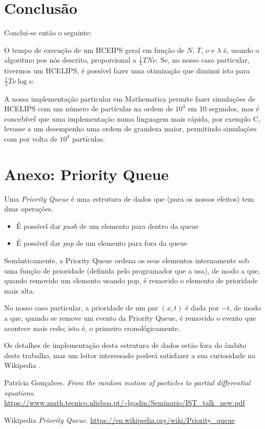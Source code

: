 \documentclass{article}
\begin{document}
	\section{Conclusão}
	
	Conclui-se então o seguinte:
	
	O tempo de execução de um HCEIPS geral em função de $N$, $T$, $\nu$ e $\lambda$ é, usando o algoritmo pos nós descrito, proporcional a $\frac 1 \lambda T N \nu$. Se, no nosso caso particular, tivermos um HCELIPS, é possível fazer uma otimização que diminui isto para $\frac 1 \lambda T \nu \log \nu$.
	
	A nossa implementação particular em Mathematica permite fazer simulações de HCELIPS com um número de partículas na ordem de $10^3$ em 10 segundos, mas é concebível que uma implementação numa linguagem mais rápida, por exemplo C, levasse a um desempenho uma ordem de grandeza maior, permitindo simulações com por volta de $10^4$ partículas.
	
	\section{Anexo: Priority Queue}
	
	Uma \emph{Priority Queue} é uma estrutura de dados que (para os nossos efeitos) tem duas operações.
	
	\begin{itemize}
	\item É possível dar \emph{push} de um elemento para dentro da queue
	
	\item É possível dar \emph{pop} de um elemento para fora da queue
	\end{itemize}
	
	Semânticamente, a Priority Queue ordena os seus elementos internamente sob uma função de prioridade (definida pelo programador que a usa), de modo a que, quando removido um elemento usando pop, é removido o elemento de prioridade mais alta.
	
	No nosso caso particular, a prioridade de um par $(x, t)$ é dada por $-t$, de modo a que, quando se remove um evento da Priority Queue, é removido o evento que acontece mais cedo; isto é, o primeiro cronológicamente.
	
	Os detalhes de implementação desta estrutura de dados estão fora do âmbito deste trabalho, mas um leitor interessado poderá satisfazer a sua curiosidade na Wikipedia \cite{wiki}. 
	
	

\begin{thebibliography}{9}
Patrícia Gonçalves. 
\textit{From the random motion of particles to partial differential equations}. 
\url{https://www.math.tecnico.ulisboa.pt/~lgodin/Seminario/IST_talk_new.pdf}
 
Wikipedia
\textit{Priority Queue}.
\url{https://en.wikipedia.org/wiki/Priority_queue}
\end{thebibliography}
\end{document}
